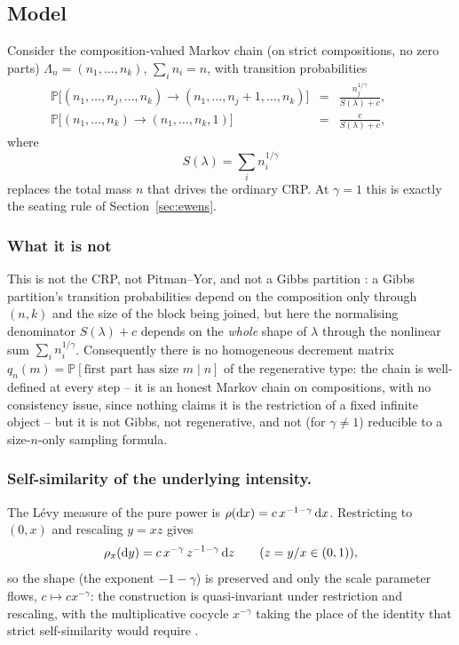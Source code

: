 \documentclass[11pt]{article}
\newcommand{\PP}{\mathbb{P}}
\theoremstyle{plain}
\theoremstyle{definition}
\begin{document}
\subsection{Model} Consider the composition-valued Markov chain (on strict compositions, no zero parts) \(\Lambda_n=(n_1,\dots,n_k)\), \(\sum_in_i=n\), with transition probabilities
\begin{eqnarray*}
\PP\bigl[(n_1,\dots,n_j,\dots,n_k)\to(n_1,\dots,n_j+1,\dots,n_k)\bigr]&=&\frac{n_j^{1/\gamma}}{S(\lambda)+c},\qquad  \\
\PP\bigl[(n_1,\dots,n_k)\to(n_1,\dots,n_k,1)\bigr]&=&\frac c{S(\lambda)+c},
\end{eqnarray*}
where
\begin{equation}
\label{eq:nlCRP}
S(\lambda)=\sum_in_i^{1/\gamma}
\end{equation}
replaces the total mass \(n\) that drives the ordinary CRP. At \(\gamma=1\) this is exactly the seating rule of Section~\ref{sec:ewens}.

\subsubsection{What it is not} This is not the CRP, not Pitman--Yor, and not a Gibbs partition \cite{gnedin2006gibbs}: a Gibbs partition's transition probabilities depend on the composition only through \((n,k)\) and the size of the block being joined, but here the normalising denominator \(S(\lambda)+c\) depends on the \emph{whole} shape of \(\lambda\) through the nonlinear sum \(\sum_in_i^{1/\gamma}\). Consequently there is no homogeneous decrement matrix \(q_n(m)=\PP[\text{first part has size }m\mid n]\) of the regenerative type: the chain is well-defined at every step -- it is an honest Markov chain on compositions, with no consistency issue, since nothing claims it is the restriction of a fixed infinite object -- but it is not Gibbs, not regenerative, and not (for \(\gamma\neq1\)) reducible to a size-\(n\)-only sampling formula.

\subsubsection{Self-similarity of the underlying intensity.} The Lévy measure of the pure power is \(\rho({\rm d}x)=c\,x^{-1-\gamma}\,{\rm d}x\). Restricting to \((0,x)\) and rescaling \(y=xz\) gives
\[
\rho_x({\rm d}y)=c\,x^{-\gamma}\,z^{-1-\gamma}\,{\rm d}z\qquad(z=y/x\in(0,1)),
\]
so the shape (the exponent \(-1-\gamma\)) is preserved and only the scale parameter flows, \(c\mapsto cx^{-\gamma}\): the construction is quasi-invariant under restriction and rescaling, with the multiplicative cocycle \(x^{-\gamma}\) taking the place of the identity that strict self-similarity would require \cite{GnedinOlshanskiQuasiInvariance2010}.
\end{document}
